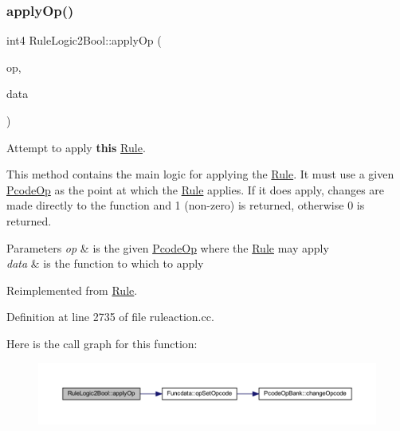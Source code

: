 \subsubsection{\texorpdfstring{applyOp()}{applyOp()}}
{\footnotesize\ttfamily int4 Rule\+Logic2\+Bool\+::apply\+Op (\begin{DoxyParamCaption}\item[{\mbox{\hyperlink{class_pcode_op}{Pcode\+Op}} $\ast$}]{op,  }\item[{\mbox{\hyperlink{class_funcdata}{Funcdata}} \&}]{data }\end{DoxyParamCaption})\hspace{0.3cm}{\ttfamily [virtual]}}



Attempt to apply {\bfseries{this}} \mbox{\hyperlink{class_rule}{Rule}}. 

This method contains the main logic for applying the \mbox{\hyperlink{class_rule}{Rule}}. It must use a given \mbox{\hyperlink{class_pcode_op}{Pcode\+Op}} as the point at which the \mbox{\hyperlink{class_rule}{Rule}} applies. If it does apply, changes are made directly to the function and 1 (non-\/zero) is returned, otherwise 0 is returned. 
\begin{DoxyParams}{Parameters}
{\em op} & is the given \mbox{\hyperlink{class_pcode_op}{Pcode\+Op}} where the \mbox{\hyperlink{class_rule}{Rule}} may apply \\
\hline
{\em data} & is the function to which to apply \\
\hline
\end{DoxyParams}


Reimplemented from \mbox{\hyperlink{class_rule_a4e3e61f066670175009f60fb9dc60848}{Rule}}.



Definition at line 2735 of file ruleaction.\+cc.

Here is the call graph for this function\+:
\nopagebreak
\begin{figure}[H]
\begin{center}
\leavevmode
\includegraphics[width=350pt]{class_rule_logic2_bool_a1e63e4098d4474ca67d56d4e0118fb82_cgraph}
\end{center}
\end{figure}
\mbox{\label{class_rule_logic2_bool_af9afc3c788caa59905c4a79a77c3b06d}} 
